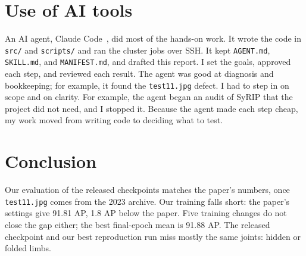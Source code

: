 \documentclass[11pt]{article}
\newcommand{\code}[1]{\texttt{#1}}
\begin{document}
\section{Use of AI tools}

An AI agent, Claude Code~\cite{claudecode}, did most of the hands-on work.
It wrote the code in \code{src/} and \code{scripts/} and ran the cluster jobs over SSH.
It kept \code{AGENT.md}, \code{SKILL.md}, and \code{MANIFEST.md}, and drafted this report.
I set the goals, approved each step, and reviewed each result.
The agent was good at diagnosis and bookkeeping; for example, it found the \code{test11.jpg} defect.
I had to step in on scope and on clarity.
For example, the agent began an audit of SyRIP that the project did not need, and I stopped it.
Because the agent made each step cheap, my work moved from writing code to deciding what to test.

\section{Conclusion}

Our evaluation of the released checkpoints matches the paper's numbers, once \code{test11.jpg} comes from the 2023 archive.
Our training falls short: the paper's settings give 91.81 AP, 1.8 AP below the paper.
Five training changes do not close the gap either; the best final-epoch mean is 91.88 AP.
The released checkpoint and our best reproduction run miss mostly the same joints: hidden or folded limbs.

\clearpage  %
\renewcommand{\bibfont}{\footnotesize}
\setlength{\bibsep}{0pt}


\end{document}
